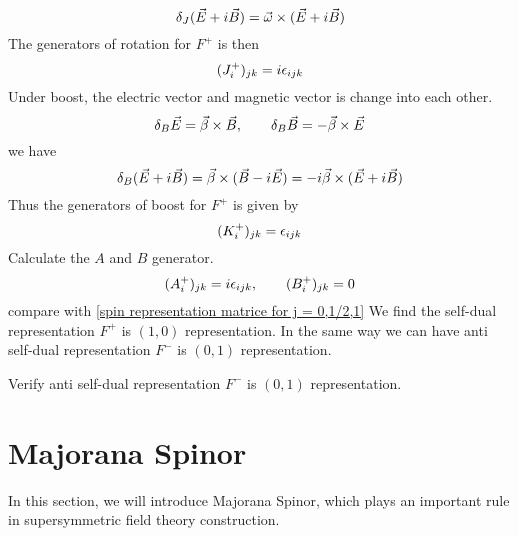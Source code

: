   \begin{equation}
  \delta_J(\vec{E} + i\vec{B}) = \vec{\omega} \times (\vec{E}+i\vec{B}) 
  \end{equation}
  The generators of rotation for $F^{+}$ is then
  \begin{equation}
  (J_i^{+})_{jk} = i\epsilon_{ijk}
  \end{equation} 
  Under boost, the electric vector and magnetic vector is change into each other.
  \begin{equation}
  \delta_B\vec{E} = \vec{\beta} \times \vec{B}, \qquad
  \delta_B\vec{B} = -\vec{\beta} \times \vec{E}
  \end{equation}
  we have
  \begin{equation}
  \delta_B(\vec{E} + i\vec{B}) =
  \vec{\beta} \times (\vec{B}-i\vec{E})=
  -i\vec{\beta}\times (\vec{E}+i\vec{B})
  \end{equation} 
  Thus the generators of boost for $F^{+}$ is given by
  \begin{equation}
  (K^{+}_i)_{jk} = \epsilon_{ijk}
  \end{equation} 
  Calculate the $A$ and $B$ generator.
  \begin{equation}
  (A_i^{+})_{jk} = i\epsilon_{ijk},\qquad 
  (B_i^{+})_{jk} = 0
  \end{equation} 
  compare with \eqref{spin representation matrice for j = 0,1/2,1}
  We find the self-dual representation $F^{+}$ is $(1,0)$ representation.
  In the same way we can have anti self-dual representation $F^{-}$ is $(0,1)$ representation.
  
  \begin{Exe}
  	Verify anti self-dual representation $F^{-}$ is $(0,1)$ representation.
  \end{Exe}
\section{Majorana Spinor}

In this section, we will introduce Majorana Spinor, which plays an important rule in supersymmetric field theory construction.

